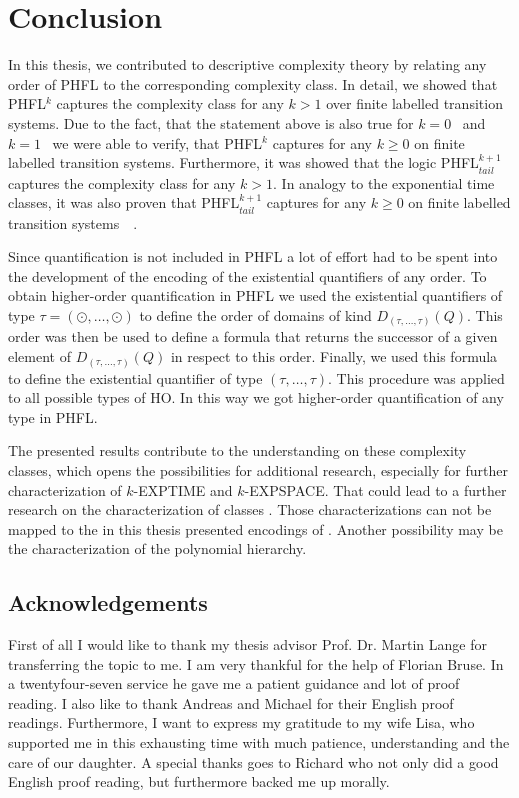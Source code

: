 \chapter{Conclusion}

In this thesis, we contributed to descriptive complexity theory by relating any order of PHFL to the corresponding complexity class. In detail, we showed that PHFL$^k$ captures the complexity class  for any $k > 1$ over finite labelled transition systems. Due to the fact, that the statement above is also true for $k = 0$~\cite{otto1999bisimulation} and $k = 1$~\cite{lange2014capturing} we were able to verify, that PHFL$^k$ captures  for any $k \geq 0$ on finite labelled transition systems. Furthermore, it was showed that the logic PHFL$^{k+1}_{tail}$ captures the complexity class  for any $k > 1$. In analogy to the exponential time classes, it was also proven that PHFL$^{k+1}_{tail}$ captures  for any $k \geq 0$ on finite labelled transition systems~\cite{otto1999bisimulation}~\cite{lange2014capturing}.

Since quantification is not included in PHFL a lot of effort had to be spent into the development of the encoding of the existential quantifiers of any order.
To obtain higher-order quantification in PHFL we used the existential quantifiers of type $\tau = (\odot, \dots, \odot)$ to define the order of domains of kind
$D_{(\tau, \dots, \tau)}(Q)$. This order was then be used to define a formula that returns the successor
of a given element of $D_{(\tau, \dots, \tau)}(Q)$ in respect to this order. Finally, we used this
formula to define the existential quantifier of type $(\tau, \dots, \tau)$. This procedure was applied to all
possible types of HO. In this way we got higher-order quantification of any type in PHFL.

The presented results contribute to the understanding on these complexity classes, which opens the possibilities for additional research, especially for further characterization of $k$-EXPTIME and $k$-EXPSPACE. That could lead to a further research on the characterization of classes . Those characterizations can not be mapped to the in this thesis presented encodings of . Another possibility may be the characterization of the polynomial hierarchy.

\section*{Acknowledgements}

First of all I would like to thank my thesis advisor Prof. Dr. Martin Lange for transferring the topic to me. I am very thankful for the help of Florian Bruse. In a twentyfour-seven service he gave me a patient guidance and lot of proof reading. I also like to thank Andreas and Michael for their English proof readings. Furthermore, I want to express my gratitude to my wife Lisa, who supported me in this exhausting time with much patience, understanding and the care of our daughter. A special thanks goes to Richard who not only did a good English proof reading, but furthermore backed me up morally. 